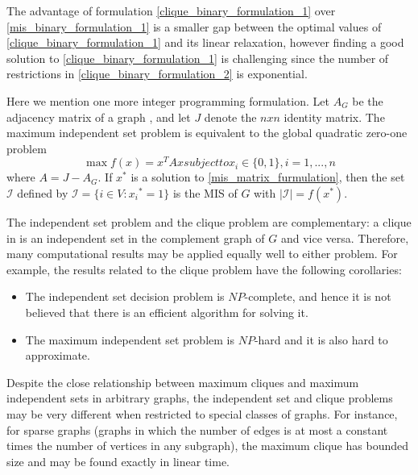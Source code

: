 The advantage of formulation \ref{clique_binary_formulation_1} over \ref{mis_binary_formulation_1} is a smaller gap between the optimal
values of \ref{clique_binary_formulation_1} and its linear relaxation, however
 finding a good solution to \ref{clique_binary_formulation_1} is challenging since the number of restrictions in \ref{clique_binary_formulation_2} is exponential.

 Here we mention one more integer programming formulation. Let $A_G$ be the
adjacency matrix of a graph \graphG, and let $J$ denote the $nxn$ identity matrix. The
maximum independent set problem is equivalent to the global quadratic zero-one problem
\begin{subequations} \label{mis_matrix_furmulation}
\begin{equation}
    \max f(x) = x^TAx   
\end{equation}
subject to 
\begin{equation}
    x_i \in \{0,1\}, i = 1,...,n
\end{equation}
\end{subequations}
where $A = J - A_G$. If $x^*$ is a solution to \ref{mis_matrix_furmulation}, then the set $\mathcal{I}$ defined by $\mathcal{I}=\{i\in V:{x_i}^*=1\}$ is the MIS of $G$ with $|\mathcal{I}|=f(x^*)$.

The independent set problem and the clique problem are complementary: a clique in \graphG is an independent set in the complement graph of $G$ and vice versa. Therefore, many computational results may be applied equally well to either problem. For example, the results related to the clique problem have the following corollaries:

\begin{itemize}
    \item The independent set decision problem is $NP$-complete, and hence it is not believed that there is an efficient algorithm for solving it.
    \item The maximum independent set problem is $NP$-hard and it is also hard to approximate.
\end{itemize}

Despite the close relationship between maximum cliques and maximum independent sets in arbitrary graphs, the independent set and clique problems may be very different when restricted to special classes of graphs. For instance, for sparse graphs (graphs in which the number of edges is at most a constant times the number of vertices in any subgraph), the maximum clique has bounded size and may be found exactly in linear time.

